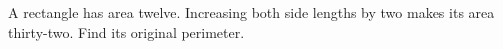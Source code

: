 A rectangle has area twelve. Increasing both side lengths by two makes its area thirty-two. Find its original perimeter.
